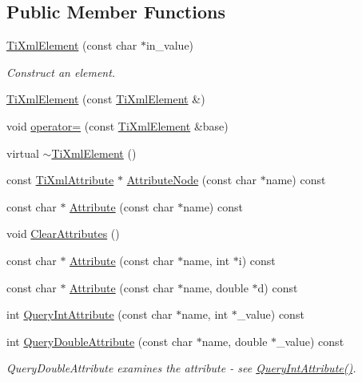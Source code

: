 \subsection*{Public Member Functions}
\begin{DoxyCompactItemize}
\item 
\hyperlink{class_ti_xml_element_a01bc3ab372d35da08efcbbe65ad90c60}{TiXmlElement} (const char $\ast$in\_\-value)
\begin{DoxyCompactList}\small\item\em Construct an element. \item\end{DoxyCompactList}\item 
\hyperlink{class_ti_xml_element_a1ca4465f3c2eac6a60e641cd7f1d9f7e}{TiXmlElement} (const \hyperlink{class_ti_xml_element}{TiXmlElement} \&)
\item 
void \hyperlink{class_ti_xml_element_af5cd4156e082ef3bf23adfe0ed173340}{operator=} (const \hyperlink{class_ti_xml_element}{TiXmlElement} \&base)
\item 
virtual \hyperlink{class_ti_xml_element_aa049a47c5081c0d021968666360da261}{$\sim$TiXmlElement} ()
\item 
const \hyperlink{class_ti_xml_attribute}{TiXmlAttribute} $\ast$ \hyperlink{class_ti_xml_element_a7810143e64e8a1d2ba278cdc79946eb1}{AttributeNode} (const char $\ast$name) const 
\item 
const char $\ast$ \hyperlink{class_ti_xml_element_ac1e4691e9375ba4e665dce7e46a50a9c}{Attribute} (const char $\ast$name) const 
\item 
void \hyperlink{class_ti_xml_element_a11ad3e12a953d9b9aaae7625bf872a7a}{ClearAttributes} ()
\item 
const char $\ast$ \hyperlink{class_ti_xml_element_aa9192e80567b5042dbded80b78c44339}{Attribute} (const char $\ast$name, int $\ast$i) const 
\item 
const char $\ast$ \hyperlink{class_ti_xml_element_aec4f727f8aa49b51248d80125d173136}{Attribute} (const char $\ast$name, double $\ast$d) const 
\item 
int \hyperlink{class_ti_xml_element_aea0bfe471380f281c5945770ddbf52b9}{QueryIntAttribute} (const char $\ast$name, int $\ast$\_\-value) const 
\item 
int \hyperlink{class_ti_xml_element_a898d7730ecc341f0bffc7a9dadbf1ce7}{QueryDoubleAttribute} (const char $\ast$name, double $\ast$\_\-value) const 
\begin{DoxyCompactList}\small\item\em QueryDoubleAttribute examines the attribute -\/ see \hyperlink{class_ti_xml_element_aea0bfe471380f281c5945770ddbf52b9}{QueryIntAttribute()}. \item\end{DoxyCompactList}\item 

\end{DoxyCompactItemize}
